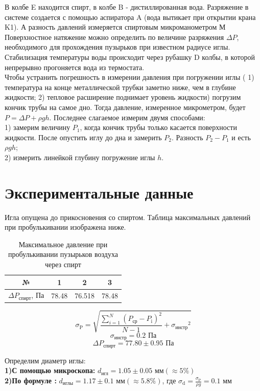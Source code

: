 В колбе E находится спирт, в колбе B - дистиллированная вода. Разряжение
в системе создается с помощью аспиратора A (вода вытикает при открытии
крана K1). А разность давлений измеряется спиртовым микроманометром М\\ \indent
Поверхностное натяжение можно определить по величине разряжения
$\Delta P$, необходимого для прохождения пузырьков при известном радиусе
иглы.\\ \indent
Стабилизация температуры воды происходит через рубашку D колбы, в
которой непрерывно прогоняется вода из термостата.\\ \indent
Чтобы устранить погрешность в измерении давления при погружении 
иглы ( 1) температура на конце металлической трубки заметно ниже, чем
в глубине жидкости; 2) тепловое расширение поднимает уровень жидкости)
погрузим кончик трубы на самое дно. Тогда давление, измеренное
микрометром, будет $P = \Delta P + \rho g h$. Последнее слагаемое
измерим двумя способами:\\
1) замерим величину $P_1$, когда кончик трубы только касается поверхности
жидкости. После опустить иглу до дна и замерить $P_2$. Разность
$P_2 - P_1$ и есть $\rho g h$;\\ 
2) измерить линейкой глубину погружение иглы  $h$. 
\section*{Экспериментальные данные}
Игла опущена до прикосновения со спиртом. Таблица максимальных давлений
при пробулькивании изображена ниже.
\begin{table}[h]
    \centering
    \begin{tabular}{|c|c|c|c|}
        \hline
        № & 1 & 2 & 3 \\ \hline
        $\Delta P_{\text{спирт}}$, Па & 78.48 & 76.518 & 78.48 \\ \hline
    \end{tabular}
    \caption{Максимальное давление при пробулькивании пузырьков
            воздуха через спирт}
\end{table}

$$\sigma_{\text{P}} = \sqrt{\frac{\sum_{i=1}^{N} (P_{\text{ср}}-P_{\text{i}})^2}{N-1}+{\sigma_{\text{инстр}}}^2}$$
$$\sigma_{\text{инстр}} = 0.2 \text{ Па}$$
$$\Delta P_{\text{спирт}} = 77.80 \pm 0.95 \text{ Па}$$

Определим диаметр иглы:\\
\textbf{1)С помощью микроскопа:}
$d_{\text{игл}} = 1.05 \pm 0.05\text{ мм} (\approx 5\%)$\\
\textbf{2)По формуле :}
$d_{\text{иглы}} = 1.17  \pm  0.1\text{ мм}  (\approx 5.8 \%)$, где 
$\sigma_\text{d} = \frac{\sigma_\text{P}}{\rho g} = 0.1 \text{ мм}$\\

